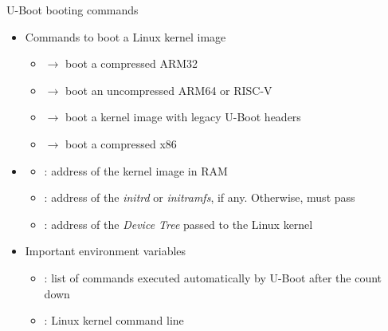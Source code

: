 \begin{frame}{U-Boot booting commands}
  \begin{itemize}
  \item Commands to boot a Linux kernel image
    \begin{itemize}
    \item {} $\rightarrow$ boot a compressed ARM32 
    \item {} $\rightarrow$ boot an uncompressed ARM64 or RISC-V 
    \item {} $\rightarrow$ boot a kernel image with legacy U-Boot headers
    \item {} $\rightarrow$ boot a compressed x86 
    \end{itemize}
  \item {}
    \begin{itemize}
    \item {}: address of the kernel image in RAM
    \item {}: address of the {\em initrd} or {\em initramfs}, if any. Otherwise, must pass \code{-}
    \item {}: address of the {\em Device Tree} passed to the Linux kernel
    \end{itemize}
  \item Important environment variables
    \begin{itemize}
    \item {}: list of commands executed automatically by
      U-Boot after the count down
    \item {}: Linux kernel command line
    \end{itemize}
  \end{itemize}
\end{frame}

